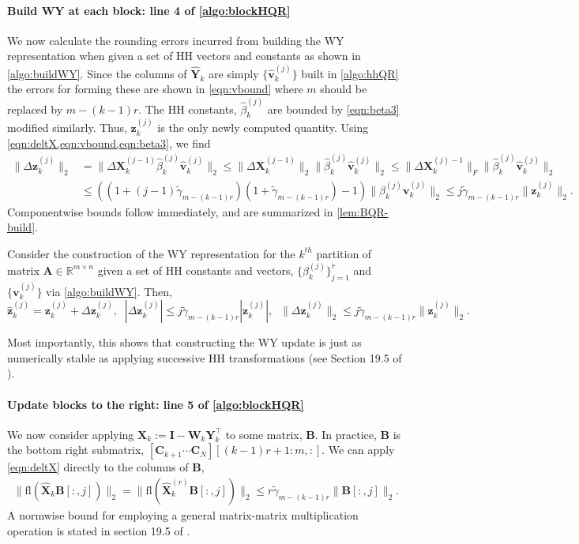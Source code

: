 \documentclass[review,onefignum,onetabnum]{siamart190516}
\newcommand{\R}{\mathbb{R}}
\newcommand{\bb}[1]{\mathbf{#1}}
\newcommand{\fl}{\mathrm{fl}}
\begin{document}
\paragraph{Build WY at each block: line 4 of \cref{algo:blockHQR}}
We now calculate the rounding errors incurred from building the WY representation when given a set of HH vectors and constants as shown in \cref{algo:buildWY}.
Since the columns of $\hat{\bb{Y}}_k$ are simply $\{\hat{\bb{v}}_k^{(j)}\}$ built in \cref{algo:hhQR} the errors for forming these are shown in \cref{eqn:vbound} where $m$ should be replaced by $m-(k-1)r$.
The HH constants, $\hat{\beta}_k^{(j)}$ are bounded by \cref{eqn:beta3} modified similarly. 
Thus, $\bb{z}_k^{(j)}$ is the only newly computed quantity. 
Using \cref{eqn:deltX,eqn:vbound,eqn:beta3}, we find
\begin{align*}
\|\Delta \bb{z}_k^{(j)}\|_2 &= \|\Delta\bb{X}_k^{(j-1)}\hat{\beta}_k^{(j)}\hat{\bb{v}}_k^{(j)} \|_2 \leq \|\Delta\bb{X}_k^{(j-1)}\|_2 \|\hat{\beta}_k^{(j)}\hat{\bb{v}}_k^{(j)}\|_2  \leq \|\Delta\bb{X}_k^{(j)-1}\|_F\|\hat{\beta}_k^{(j)}\hat{\bb{v}}_k^{(j)}\|_2 \\
& \leq \left((1+(j-1)\tilde{\gamma}_{m-(k-1)r})(1 + \tilde{\gamma}_{m-(k-1)r})-1\right) \| \beta_k^{(j)}\bb{v}_k^{(j)}\|_2 \leq j\tilde{\gamma}_{m-(k-1)r}\|\bb{z}_k^{(j)}\|_2.
\end{align*}
Componentwise bounds follow immediately, and are summarized in \cref{lem:BQR-build}.
\begin{lemma}\label{lem:BQR-build}
	Consider the construction of the WY representation for the $k^{th}$ partition of matrix $\bb{A}\in\R^{m\times n}$ given a set of HH constants and vectors, $\{\beta_k^{(j)}\}_{j=1}^r$ and $\{\bb{v}_{k}^{(j)}\}$ via \cref{algo:buildWY}.
	Then, 
	\begin{equation}
		\hat{\bb{z}}_{k}^{(j)} = \bb{z}_{k}^{(j)} + \Delta \bb{z}_{k}^{(j)},\;\; |\Delta \bb{z}_{k}^{(j)}| \leq j\tilde{\gamma}_{m-(k-1)r} |\bb{z}_{k}^{(j)}|,\;\; \|\Delta \bb{z}_k^{(j)}\|_2 \leq j\tilde{\gamma}_{m-(k-1)r}\|\bb{z}_k^{(j)}\|_2.\label{eqn:BQR-z}
	\end{equation}
\end{lemma}
Most importantly, this shows that constructing the WY update is just as numerically stable as applying successive HH transformations (see Section 19.5 of \cite{Higham2002}).

\paragraph{Update blocks to the right: line 5 of \cref{algo:blockHQR}}
We now consider applying $\bb{X}_{k}:=\bb{I}-\bb{W}_k\bb{Y}_k^{\top}$ to some matrix, $\bb{B}$.
In practice, $\bb{B}$ is the bottom right submatrix, $[\bb{C}_{k+1}\cdots \bb{C}_{N}][(k-1)r+1:m,:]$.
We can apply \cref{eqn:deltX} directly to the columns of $\bb{B}$, 
\begin{align}
	\|\fl(\hat{\bb{X}}_k \bb{B}[:,j])\|_2 = \|\fl(\hat{\bb{X}}_k^{(r)} \bb{B}[:,j])\|_2 \leq r\tilde{\gamma}_{m-(k-1)r} \|\bb{B}[:,j]\|_2.
\end{align}
A normwise bound for employing a general matrix-matrix multiplication operation is stated in section 19.5 of \cite{Higham2002}.
\end{document}
